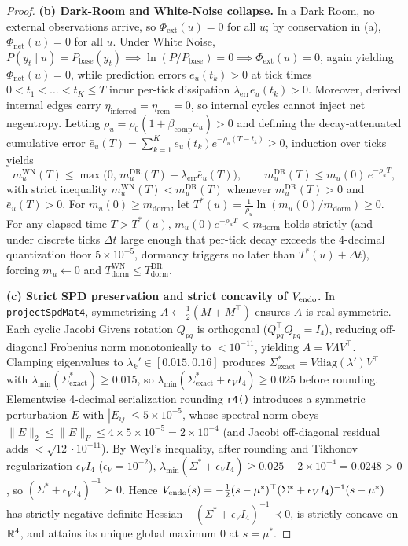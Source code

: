 \begin{proof}
\textbf{(b) Dark-Room and White-Noise collapse.}
In a Dark Room, no external observations arrive, so $\Phi_{\mathrm{ext}}(u) = 0$ for all $u$; by conservation in (a), $\Phi_{\mathrm{net}}(u) = 0$ for all $u$. Under White Noise, $P(y_t \mid u) = P_{\mathrm{base}}(y_t) \implies \ln(P/P_{\mathrm{base}}) = 0 \implies \Phi_{\mathrm{ext}}(u) = 0$, again yielding $\Phi_{\mathrm{net}}(u) = 0$, while prediction errors $e_u(t_k) > 0$ at tick times $0 < t_1 < \dots < t_K \le T$ incur per-tick dissipation $\lambda_{\mathrm{err}} e_u(t_k) > 0$. Moreover, derived internal edges carry $\eta_{\mathrm{inferred}} = \eta_{\mathrm{rem}} = 0$, so internal cycles cannot inject net negentropy. Letting $\rho_u = \rho_0(1 + \beta_{\mathrm{comp}} a_u) > 0$ and defining the decay-attenuated cumulative error $\bar{e}_u(T) = \sum_{k=1}^K e_u(t_k) e^{-\rho_u(T - t_k)} \ge 0$, induction over ticks yields
\[
  m_u^{\mathrm{WN}}(T) \le \max\!\big(0,\, m_u^{\mathrm{DR}}(T) - \lambda_{\mathrm{err}} \bar{e}_u(T)\big),
  \qquad m_u^{\mathrm{DR}}(T) \le m_u(0)\, e^{-\rho_u T},
\]
with strict inequality $m_u^{\mathrm{WN}}(T) < m_u^{\mathrm{DR}}(T)$ whenever $m_u^{\mathrm{DR}}(T) > 0$ and $\bar{e}_u(T) > 0$. For $m_u(0) \ge m_{\mathrm{dorm}}$, let $T^*(u) = \frac{1}{\rho_u}\ln(m_u(0)/m_{\mathrm{dorm}}) \ge 0$. For any elapsed time $T > T^*(u)$, $m_u(0) e^{-\rho_u T} < m_{\mathrm{dorm}}$ holds strictly (and under discrete ticks $\Delta t$ large enough that per-tick decay exceeds the 4-decimal quantization floor $5\times 10^{-5}$, dormancy triggers no later than $T^*(u) + \Delta t$), forcing $m_u \leftarrow 0$ and $T_{\mathrm{dorm}}^{\mathrm{WN}} \le T_{\mathrm{dorm}}^{\mathrm{DR}}$.

\textbf{(c) Strict SPD preservation and strict concavity of $V_{\mathrm{endo}}$.}
In \texttt{projectSpdMat4}, symmetrizing $A \leftarrow \tfrac{1}{2}(M + M^\top)$ ensures $A$ is real symmetric. Each cyclic Jacobi Givens rotation $Q_{pq}$ is orthogonal ($Q_{pq}^\top Q_{pq} = I_4$), reducing off-diagonal Frobenius norm monotonically to $< 10^{-11}$, yielding $A = V \Lambda V^\top$. Clamping eigenvalues to $\lambda_k' \in [0.015, 0.16]$ produces $\Sigma^*_{\mathrm{exact}} = V \mathrm{diag}(\lambda') V^\top$ with $\lambda_{\min}(\Sigma^*_{\mathrm{exact}}) \ge 0.015$, so $\lambda_{\min}(\Sigma^*_{\mathrm{exact}} + \epsilon_V I_4) \ge 0.025$ before rounding. Elementwise 4-decimal serialization rounding \texttt{r4()} introduces a symmetric perturbation $E$ with $|E_{ij}| \le 5\times 10^{-5}$, whose spectral norm obeys $\|E\|_2 \le \|E\|_F \le 4 \times 5\times 10^{-5} = 2\times 10^{-4}$ (and Jacobi off-diagonal residual adds $< \sqrt{12}\cdot 10^{-11}$). By Weyl's inequality, after rounding and Tikhonov regularization $\epsilon_V I_4$ ($\epsilon_V = 10^{-2}$), $\lambda_{\min}(\Sigma^* + \epsilon_V I_4) \ge 0.025 - 2\times 10^{-4} = 0.0248 > 0$, so $(\Sigma^* + \epsilon_V I_4)^{-1} \succ 0$. Hence $V_{\mathrm{endo}}(s) = -\tfrac{1}{2}(s-\mu^*)^\top(\Sigma^* + \epsilon_V I_4)^{-1}(s-\mu^*)$ has strictly negative-definite Hessian $-(\Sigma^* + \epsilon_V I_4)^{-1} \prec 0$, is strictly concave on $\mathbb{R}^4$, and attains its unique global maximum $0$ at $s = \mu^*$.


\end{proof}
